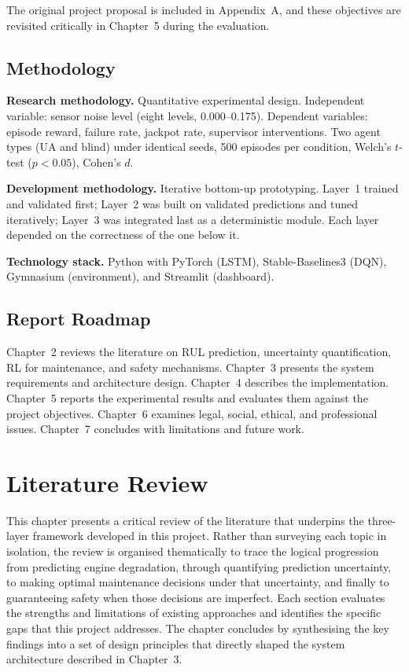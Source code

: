 \documentclass[12pt,a4paper]{report}
\begin{document}
The original project proposal is included in Appendix~A, and these objectives are revisited critically in Chapter~5 during the evaluation.

\section{Methodology}

\textbf{Research methodology.} Quantitative experimental design. Independent variable: sensor noise level (eight levels, 0.000--0.175). Dependent variables: episode reward, failure rate, jackpot rate, supervisor interventions. Two agent types (UA and blind) under identical seeds, 500 episodes per condition, Welch's $t$-test ($p < 0.05$), Cohen's $d$.

\textbf{Development methodology.} Iterative bottom-up prototyping. Layer~1 trained and validated first; Layer~2 was built on validated predictions and tuned iteratively; Layer~3 was integrated last as a deterministic module. Each layer depended on the correctness of the one below it.

\textbf{Technology stack.} Python with PyTorch (LSTM), Stable-Baselines3 \citep{raffin2021stable} (DQN), Gymnasium \citep{brockman2016openai} (environment), and Streamlit (dashboard).

\section{Report Roadmap}

Chapter~2 reviews the literature on RUL prediction, uncertainty quantification, RL for maintenance, and safety mechanisms. Chapter~3 presents the system requirements and architecture design. Chapter~4 describes the implementation. Chapter~5 reports the experimental results and evaluates them against the project objectives. Chapter~6 examines legal, social, ethical, and professional issues. Chapter~7 concludes with limitations and future work.


\chapter{Literature Review}

This chapter presents a critical review of the literature that underpins the three-layer framework developed in this project. Rather than surveying each topic in isolation, the review is organised thematically to trace the logical progression from predicting engine degradation, through quantifying prediction uncertainty, to making optimal maintenance decisions under that uncertainty, and finally to guaranteeing safety when those decisions are imperfect. Each section evaluates the strengths and limitations of existing approaches and identifies the specific gaps that this project addresses. The chapter concludes by synthesising the key findings into a set of design principles that directly shaped the system architecture described in Chapter~3.
\end{document}
